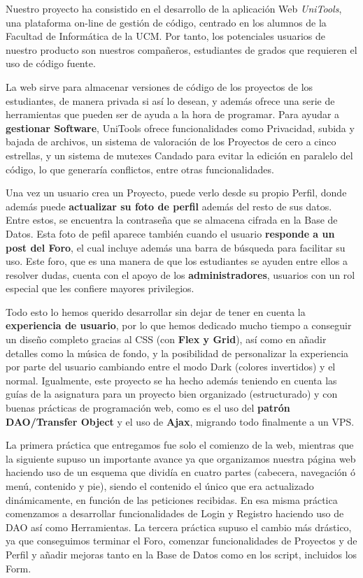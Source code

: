 \documentclass[12pt]{report}
\begin{document}
Nuestro proyecto ha consistido en el desarrollo de la aplicación Web \textit{UniTools}, una plataforma on-line de gestión de código, centrado en los alumnos de la Facultad de Informática de la UCM. Por tanto, los potenciales usuarios de nuestro producto son nuestros compañeros, estudiantes de grados que requieren el uso de código fuente.

La web sirve para almacenar versiones de código de los proyectos de los estudiantes, de manera privada si así lo desean, y además ofrece una serie de herramientas que pueden ser de ayuda a la hora de programar. Para ayudar a \textbf{gestionar Software}, UniTools ofrece funcionalidades como Privacidad, subida y bajada de archivos, un sistema de valoración de los Proyectos de cero a cinco estrellas, y un sistema de mutexes Candado para evitar la edición en paralelo del código, lo que generaría conflictos, entre otras funcionalidades.

Una vez un usuario crea un Proyecto, puede verlo desde su propio Perfil, donde además puede \textbf{actualizar su foto de perfil} además del resto de sus datos. Entre estos, se encuentra la contraseña que se almacena cifrada en la Base de Datos. Esta foto de pefil aparece también cuando el usuario \textbf{responde a un post del Foro}, el cual incluye además una barra de búsqueda para facilitar su uso. Este foro, que es una manera de que los estudiantes se ayuden entre ellos a resolver dudas, cuenta con el apoyo de los \textbf{administradores}, usuarios con un rol especial que les confiere mayores privilegios.

Todo esto lo hemos querido desarrollar sin dejar de tener en cuenta la \textbf{experiencia de usuario}, por lo que hemos dedicado mucho tiempo a conseguir un diseño completo gracias al CSS (con \textbf{Flex y Grid}), así como en añadir detalles como la música de fondo, y la posibilidad de personalizar la experiencia por parte del usuario cambiando entre el modo Dark (colores invertidos) y el normal. Igualmente, este proyecto se ha hecho además teniendo en cuenta las guías de la asignatura para un proyecto bien organizado (estructurado) y con buenas prácticas de programación web, como es el uso del \textbf{patrón DAO/Transfer Object} y el uso de \textbf{Ajax}, migrando todo finalmente a un VPS.

La primera práctica que entregamos fue solo el comienzo de la web, mientras que la siguiente supuso un importante avance ya que organizamos nuestra página web haciendo uso de un esquema que dividía en cuatro partes (cabecera, navegación ó menú, contenido y pie), siendo el contenido el único que era actualizado dinámicamente, en función de las peticiones recibidas. En esa misma práctica comenzamos a desarrollar funcionalidades de Login y Registro haciendo uso de DAO así como Herramientas. La tercera práctica supuso el cambio más drástico, ya que conseguimos terminar el Foro, comenzar funcionalidades de Proyectos y de Perfil y añadir mejoras tanto en la Base de Datos como en los script, incluidos los Form. 
\end{document}
